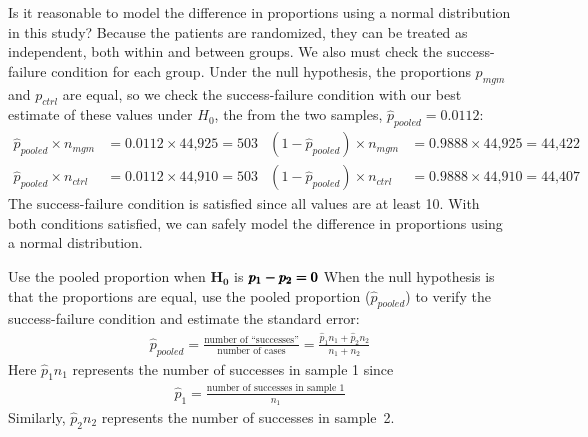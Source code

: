 \begin{examplewrap}
\begin{nexample}{Is it reasonable to model the difference
    in proportions using a normal distribution in this
    study?}
  \label{condFormammogramStudySummaryTableNormalInference}%
  Because the patients are randomized, they can be treated
  as independent, both within and between groups.
  We also must check the success-failure condition for each group.
  Under the null hypothesis, the proportions $p_{mgm}$
  and $p_{ctrl}$ are equal, so we check the success-failure
  condition with our best estimate of these values under $H_0$,
  the  from the two samples,
  $\hat{p}_{\textit{pooled}} = 0.0112$:
  \begin{align*}
  \hat{p}_{\textit{pooled}} \times n_{mgm}
      &= 0.0112 \times \text{44,925} = 503
    & (1 - \hat{p}_{\textit{pooled}}) \times n_{mgm}
      &= 0.9888 \times \text{44,925} = \text{44,422} \\
  \hat{p}_{\textit{pooled}} \times n_{ctrl}
      &= 0.0112 \times \text{44,910} = 503
    & (1 - \hat{p}_{\textit{pooled}}) \times n_{ctrl}
      &= 0.9888 \times \text{44,910} = \text{44,407}
  \end{align*}
  The success-failure condition is satisfied since
  all values are at least 10.
  With both conditions satisfied, we can safely model
  the difference in proportions using a normal
  distribution.
\end{nexample}
\end{examplewrap}

\begin{onebox}{Use the pooled proportion when
    $\pmb{H_0}$ is $\pmb{\MakeLowercase{p_1 - p_2 = 0}}$}
  When the null hypothesis is that the proportions are equal,
  use the pooled proportion ($\hat{p}_{\textit{pooled}}$)
  to verify the
  success-failure condition and estimate the standard error:
  \begin{eqnarray*}
  \hat{p}_{\textit{pooled}}
    = \frac{\text{number of ``successes''}}
      {\text{number of cases}}
    = \frac{\hat{p}_1 n_1 + \hat{p}_2 n_2}{n_1 + n_2}
  \end{eqnarray*}
  Here $\hat{p}_1 n_1$ represents the number of successes in
  sample 1 since
  \begin{eqnarray*}
  \hat{p}_1
    = \frac{\text{number of successes in sample 1}}{n_1}
  \end{eqnarray*}
  Similarly, $\hat{p}_2 n_2$ represents the number
  of successes in sample~2.
\end{onebox}

